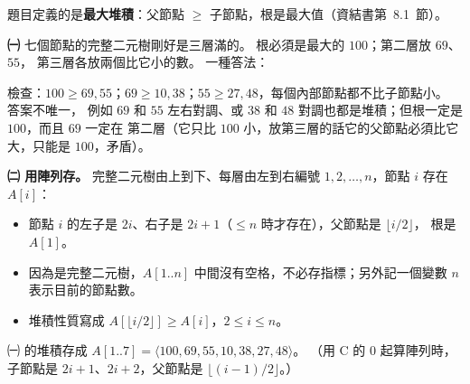 \begin{pastsoln}
題目定義的是\textbf{最大堆積}：父節點 $\ge$ 子節點，根是最大值（資結書第~8.1~節）。

\textbf{㈠} 七個節點的完整二元樹剛好是三層滿的。 根必須是最大的 $100$；第二層放 $69$、$55$，
第三層各放兩個比它小的數。 一種答法：
\begin{center}
\end{center}
檢查：$100 \ge 69, 55$；$69 \ge 10, 38$；$55 \ge 27, 48$，每個內部節點都不比子節點小。 答案不唯一，
例如 $69$ 和 $55$ 左右對調、或 $38$ 和 $48$ 對調也都是堆積；但根一定是 $100$，而且 $69$ 一定在
第二層（它只比 $100$ 小，放第三層的話它的父節點必須比它大，只能是 $100$，矛盾）。

\textbf{㈡ 用陣列存。} 完整二元樹由上到下、每層由左到右編號 $1, 2, \ldots, n$，節點 $i$ 存在
$A[i]$：
\begin{itemize}[nosep]
\item 節點 $i$ 的左子是 $2i$、右子是 $2i + 1$（$\le n$ 時才存在），父節點是 $\lfloor i/2 \rfloor$，
根是 $A[1]$。
\item 因為是完整二元樹，$A[1..n]$ 中間沒有空格，不必存指標；另外記一個變數 $n$ 表示目前的節點數。
\item 堆積性質寫成 $A[\lfloor i/2 \rfloor] \ge A[i]$，$2 \le i \le n$。
\end{itemize}
㈠ 的堆積存成 $A[1..7] = \langle 100, 69, 55, 10, 38, 27, 48 \rangle$。 （用 C 的 $0$ 起算陣列時，
子節點是 $2i+1$、$2i+2$，父節點是 $\lfloor (i-1)/2 \rfloor$。）


\end{pastsoln}
